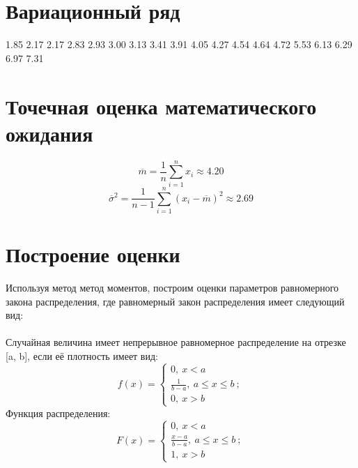 \documentclass{article}
\begin{document}
\section{Вариационный ряд}
1.85 2.17 2.17 2.83 2.93 3.00 3.13 3.41 3.91 4.05 4.27 4.54 4.64 4.72 5.53 6.13 6.29 6.97 7.31
\section{Точечная оценка математического ожидания}
\[\overline{m} = \frac{1}{n}\sum_{i=1}^{n}x_i \approx 4.20\]
\[\overline{\sigma}^2 = \frac{1}{n-1}\sum_{i=1}^{n}(x_i-\overline{m})^2 \approx 2.69\]
\section{Построение оценки}
Используя метод метод моментов, построим оценки параметров равномерного закона распределения, где равномерный закон распределения имеет следующий вид:
\\ \\
Случайная величина имеет непрерывное равномерное распределение на отрезке [a, b], если её плотность имеет вид:
\[f(x) = 
\begin{cases}
    0,\ x<a\\
    \frac{1}{b-a},\ a\leq x\leq b\ ;\\
    0,\ x>b
\end{cases}
 \] 
Функция распределения:
 \[F(x) = 
\begin{cases}
    0,\ x<a\\
    \frac{x-a}{b-a},\ a\leq x\leq b\ ;\\
    1,\ x>b
\end{cases}
\]
\end{document}
